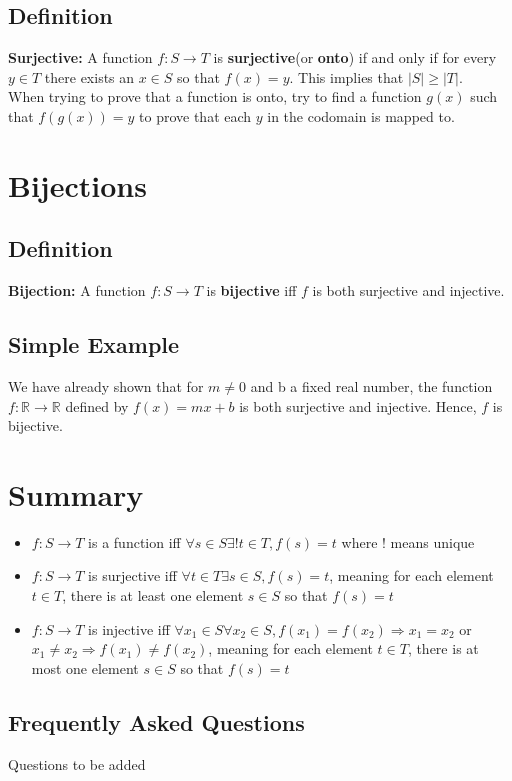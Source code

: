 \documentclass[12pt]{report}
\begin{document}
		\subsection{Definition}
			\textbf{Surjective:} A function $f:S \rightarrow T$ is \textbf{surjective}(or \textbf{onto}) if and only if for every $y \in T$ there exists an $x \in S $ so that $f(x) = y$. This implies that $|S| \geq |T|$. \\
			When trying to prove that a function is onto, try to find a function $g(x)$ such that $f(g(x)) = y$ to prove that each $y$ in the codomain is mapped to.
	\section{Bijections}
		\subsection{Definition}
			\textbf{Bijection:} A function $f:S \rightarrow T$ is \textbf{bijective} iff $f$ is both surjective and injective.
		\subsection{Simple Example}
			We have already shown that for $m \neq 0$ and b a fixed real number, the function $f:\mathbb{R} \rightarrow \mathbb{R}$ defined by $f(x) = mx + b$ is both surjective and injective. Hence, $f$ is bijective.

	\section{Summary}
		\begin{itemize}
			\item $f:S \rightarrow T$ is a function iff $\forall s \in S \exists !t \in T, f(s) = t$ where ! means unique
			\item $f:S \rightarrow T$ is surjective iff $\forall t \in T \exists s \in S, f(s) = t$, meaning for each element $t \in T$, there is at least one element $s \in S$ so that $f(s) = t$			

			\item $f:S \rightarrow T$ is injective iff $\forall x_1 \in S \forall x_2 \in S, f(x_1) = f(x_2) \Rightarrow x_1 = x_2$ or $x_1 \neq x_2 \Rightarrow f(x_1) \neq f(x_2)$, meaning for each element $t \in T$, there is at most one element $s \in S$ so that $f(s) = t$			
		\end{itemize}
		\subsection{Frequently Asked Questions}
			Questions to be added
\end{document}
